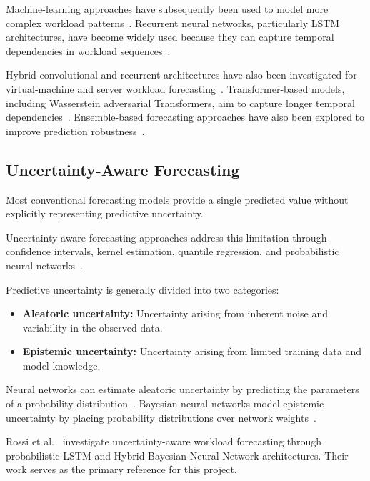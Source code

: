 \documentclass[conference]{IEEEtran}
\begin{document}
Machine-learning approaches have subsequently been used to model more complex workload patterns~\cite{gao2020}. Recurrent neural networks, particularly LSTM architectures, have become widely used because they can capture temporal dependencies in workload sequences~\cite{song2018,bi2021}.

Hybrid convolutional and recurrent architectures have also been investigated for virtual-machine and server workload forecasting~\cite{leka2021,patel2022}. Transformer-based models, including Wasserstein adversarial Transformers, aim to capture longer temporal dependencies~\cite{arbat2022}. Ensemble-based forecasting approaches have also been explored to improve prediction robustness~\cite{kim2020,bao2022}.

\subsection{Uncertainty-Aware Forecasting}

Most conventional forecasting models provide a single predicted value without explicitly representing predictive uncertainty.

Uncertainty-aware forecasting approaches address this limitation through confidence intervals, kernel estimation, quantile regression, and probabilistic neural networks~\cite{minarolli2017,mammen2023}.

Predictive uncertainty is generally divided into two categories:

\begin{itemize}
\item \textbf{Aleatoric uncertainty:} Uncertainty arising from inherent noise and variability in the observed data.

\item \textbf{Epistemic uncertainty:} Uncertainty arising from limited training data and model knowledge.
\end{itemize}

Neural networks can estimate aleatoric uncertainty by predicting the parameters of a probability distribution~\cite{nix1994}. Bayesian neural networks model epistemic uncertainty by placing probability distributions over network weights~\cite{blundell2015}.

Rossi et al.~\cite{rossi2022,rossi2025} investigate uncertainty-aware workload forecasting through probabilistic LSTM and Hybrid Bayesian Neural Network architectures. Their work serves as the primary reference for this project.
\end{document}
